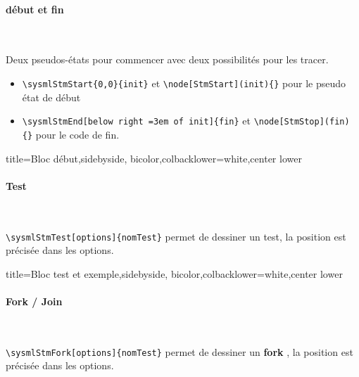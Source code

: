 \documentclass[a4paper,11pt]{article}                      %
\begin{document}
\paragraph{début et fin}~\par

Deux pseudos-états pour commencer   avec deux possibilités pour les tracer.

\begin{itemize}
\item \verb!\sysmlStmStart{0,0}{init}!  et \verb!\node[StmStart](init){}!  pour le pseudo état de début
\item \verb!\sysmlStmEnd[below right =3em of init]{fin}!  et  \verb!\node[StmStop](fin) {}!  pour le code de fin.
\end{itemize}
\begin{tcblisting}{title={Bloc début},sidebyside, bicolor,colbacklower=white,center lower}
\end{tcblisting}

\paragraph{Test}~\par

\verb!\sysmlStmTest[options]{nomTest}!  permet de dessiner un test, la position est précisée dans les options.

\begin{tcblisting}{title={Bloc test  et exemple},sidebyside, bicolor,colbacklower=white,center lower}
\end{tcblisting}

\paragraph{Fork / Join}~\par

\verb!\sysmlStmFork[options]{nomTest}!  permet de dessiner un \textbf{fork} , la position est précisée dans les options.
\end{document}
